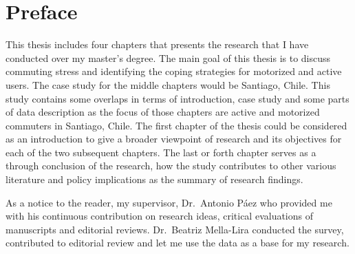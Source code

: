 \documentclass[
11pt, %
oneside, %
english, %
singlespacing, %
]{macthesis} %
\begin{document}



\label{lastoffront}
\clearpage


\mainmatter %
\pagestyle{thesis}
\hypertarget{preface}{%
\chapter{Preface}\label{preface}}

This thesis includes four chapters that presents the research that I have conducted over my master's degree. The main goal of this thesis is to discuss commuting stress and identifying the coping strategies for motorized and active users. The case study for the middle chapters would be Santiago, Chile. This study contains some overlaps in terms of introduction, case study and some parts of data description as the focus of those chapters are active and motorized commuters in Santiago, Chile. The first chapter of the thesis could be considered as an introduction to give a broader viewpoint of research and its objectives for each of the two subsequent chapters. The last or forth chapter serves as a through conclusion of the research, how the study contributes to other various literature and policy implications as the summary of research findings.

As a notice to the reader, my supervisor, Dr.~Antonio Páez who provided me with his continuous contribution on research ideas, critical evaluations of manuscripts and editorial reviews. Dr.~Beatriz Mella-Lira conducted the survey, contributed to editorial review and let me use the data as a base for my research.
\end{document}
